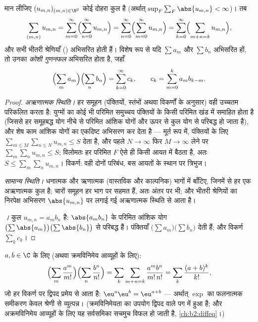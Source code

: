 \begin{theorem}[कुलों के लिए फ़ूबिनी; कोशी गुणनफल]\label{thm:b2:series:fubini}
मान लीजिए $(u_{m,n})_{(m,n) \in \N^2}$ कोई  दोहरा कुल है (अर्थात् $\sup_F \sum_F \abs{u_{m,n}} < \infty$)। तब
\[
\sum_{(m,n)} u_{m,n}
= \sum_{m=0}^{\infty}\Bigl(\sum_{n=0}^{\infty} u_{m,n}\Bigr)
= \sum_{n=0}^{\infty}\Bigl(\sum_{m=0}^{\infty} u_{m,n}\Bigr)
= \sum_{k=0}^{\infty}\Bigl(\sum_{m+n=k} u_{m,n}\Bigr),
\]
और सभी भीतरी श्रेणियाँ () अभिसरित होती हैं। विशेष रूप से
यदि $\sum
a_m$ और $\sum b_n$  अभिसरित हों, तो उनका \emph{कोशी
गुणनफल}  अभिसरित होता है, जहाँ
\[
\Bigl(\sum_m a_m\Bigr)\Bigl(\sum_n b_n\Bigr)
= \sum_{k=0}^{\infty} c_k,
\qquad
c_k = \sum_{m=0}^{k} a_m b_{k-m} .
\]
\end{theorem}

\begin{proof}
\emph{अऋणात्मक स्थिति।} हर समूहन (पंक्तियों, स्तंभों अथवा विकर्णों के
अनुसार) वही उच्चतम परिकलित करता है: युग्मों का कोई भी परिमित समुच्चय
पंक्तियों के किसी परिमित खंड में समाहित होता है (जिससे हर समूहबद्ध योग
नीचे से परिमित आंशिक योगों और ऊपर से कुल योग से परिबद्ध हो जाता है), और
शेष काम आंशिक योगों का एकदिष्ट अभिसरण कर देता है --- मूर्त रूप में,
पंक्तियों के लिए $\sum_{m \leq M}\sum_{n \leq N} u_{m,n} \leq S$ देता है, और पहले $N
\to \infty$ फिर $M \to \infty$ लेने पर $\sum_m \sum_n u_{m,n} \leq S$; विलोमतः
हर परिमित $F$ ऐसे ही किसी आयत में बैठता है, अतः $S \leq
\sum_m\sum_n u_{m,n}$। विकर्ण: वही दोनों
परिबंध, बस आयतों के स्थान पर त्रिभुज।

\emph{सामान्य स्थिति।} धनात्मक और ऋणात्मक (वास्तविक और काल्पनिक) भागों
में बाँटिए, जिनमें से हर एक  अऋणात्मक कुल है; चारों समूहन हर भाग पर
सहमत हैं, अतः अंतर पर भी; और भीतरी श्रेणियों का निरपेक्ष अभिसरण $\abs{u_{m,n}}$ पर
लगाई गई अऋणात्मक स्थिति से आता है।

\emph{।} कुल $u_{m,n} = a_m b_n$  है: $\abs{a_mb_n}$ के परिमित आंशिक योग $\bigl(\sum\abs{a_m}\bigr)\bigl(\sum\abs{b_n}\bigr)$ से
परिबद्ध हैं। पंक्तियाँ $\bigl(\sum a_m\bigr)\bigl(\sum b_n\bigr)$ देती हैं; और विकर्ण $\sum_k
c_k$।
\end{proof}

\begin{example}[घातांकी सर्वसमिका, ईमानदारी से]\label{ex:b2:series:exp}
$a, b \in \C$ के लिए (अथवा क्रमविनिमेय आव्यूहों के लिए):
\[
\Bigl(\sum_m \frac{a^m}{m!}\Bigr)\Bigl(\sum_n
\frac{b^n}{n!}\Bigr)
= \sum_k \sum_{m+n=k} \frac{a^m b^n}{m!\,n!}
= \sum_k \frac{(a + b)^k}{k!},
\]
जो हर विकर्ण पर द्विपद प्रमेय से आता है: $\eu^a \eu^b = \eu^{a+b}$ --- अर्थात् $\exp$ का
फलनात्मक समीकरण केवल श्रेणी से व्युत्पन्न। (क्रमविनिमेयता का उपयोग
द्विपद वाले पग में हुआ है; और अक्रमविनिमेय आव्यूहों के लिए यह सर्वसमिका
सचमुच विफल हो जाती है, \cref{ch:b2:diffeq}।)
\end{example}

